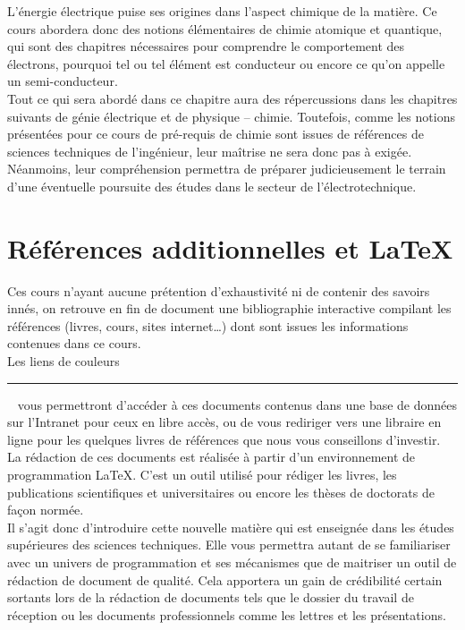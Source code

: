 L'énergie électrique puise ses origines dans l'aspect chimique de la matière. Ce cours abordera donc des notions élémentaires de chimie atomique et quantique, qui sont des chapitres nécessaires pour comprendre le comportement des électrons, pourquoi tel ou tel élément est conducteur ou encore ce qu'on appelle un semi-conducteur.\\Tout ce qui sera abordé dans ce chapitre aura des répercussions dans les chapitres suivants de génie électrique et de physique -- chimie. Toutefois, comme les notions présentées pour ce cours de pré-requis de chimie sont issues de références de sciences techniques de l'ingénieur, leur maîtrise ne sera donc pas à exigée. Néanmoins, leur compréhension permettra de préparer judicieusement le terrain d'une éventuelle poursuite des études dans le secteur de l'électrotechnique.


\section{Références additionnelles et \textrm{\LaTeX}}

Ces cours n'ayant aucune prétention d'exhaustivité ni de contenir des savoirs innés, on retrouve en fin de document une bibliographie interactive compilant les références (livres, cours, sites internet\ldots) dont sont issues les informations contenues dans ce cours.\\Les liens de couleurs ~\textcolor{Blue}{\rule{1.5em}{1.2ex}}~ vous permettront d'accéder à ces documents contenus dans une base de données sur l'Intranet pour ceux en libre accès, ou de vous rediriger vers une libraire en ligne pour les quelques livres de références que nous vous conseillons d'investir.\\

La rédaction de ces documents est réalisée à partir d'un environnement de programmation \LaTeX. C'est un outil utilisé pour rédiger les livres, les publications scientifiques et universitaires ou encore les thèses de doctorats de façon normée.\\Il s'agit donc d'introduire cette nouvelle matière qui est enseignée dans les études supérieures des sciences techniques. Elle vous permettra autant de se familiariser avec un univers de programmation et ses mécanismes que de maitriser un outil de rédaction de document de qualité. Cela apportera un gain de crédibilité certain sortants lors de la rédaction de documents tels que le dossier du travail de réception ou les documents professionnels comme les lettres et les présentations.


%